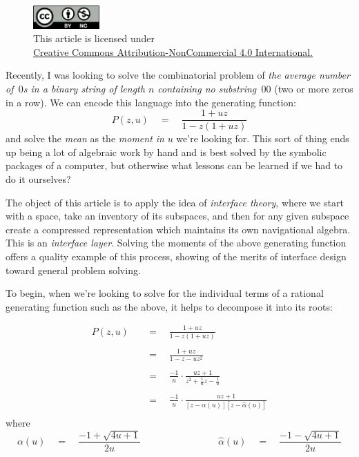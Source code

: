 \documentclass[twoside]{article}
\newcommand{\equals}{\ensuremath{\quad =\quad}}
\newcommand{\fourqquad}{\ensuremath{\qquad\qquad\qquad\qquad}}
\newcommand{\alphahat}{\ensuremath{\hat{\alpha}}}
\begin{document}
\begin{figure}[h]
\centering
\includegraphics[width=1in]{../../../cc-by-nc.png}\\[0.1in]
\tiny This article is licensed under \\
\href{http://creativecommons.org/licenses/by-nc/4.0/}
{Creative Commons Attribution-NonCommercial 4.0 International.}\\[0.3in]
\end{figure}

Recently, I was looking to solve the combinatorial problem of \emph{the average number of \,$ 0 $s in a binary string of length
$ n $ containing no substring \,$ 00 $} (two or more zeros in a row). We can encode this language into the generating function:
$$ P(z,u)\quad=\quad\frac{1+uz}{1-z(1+uz)} $$
and solve the \emph{mean} as the \emph{moment in} $ u $ we're looking for. This sort of thing ends up being a lot of algebraic
work by hand and is best solved by the symbolic packages of a computer, but otherwise what lessons can be learned if we had to
do it ourselves?

The object of this article is to apply the idea of \emph{interface theory}, where we start with a space, take an inventory
of its subspaces, and then for any given subspace create a compressed representation which maintains its own navigational algebra.
This is an \emph{interface layer}. Solving the moments of the above generating function offers a quality example of this process,
showing of the merits of interface design toward general problem solving.

To begin, when we're looking to solve for the individual terms of a rational generating function such as the above, it helps to decompose
it into its roots:

\begin{align*}
P(z,u)	& \equals \frac{1+uz}{1-z(1+uz)}						\\
											\\
	& \equals \frac{1+uz}{1-z-uz^2}							\\
											\\
	& \equals \frac{-1}{u} \cdot \frac{uz+1}{z^2+\frac{1}{u}z-\frac{1}{u}}		\\
											\\
	& \equals \frac{-1}{u} \cdot \frac{uz+1}{[z-\alpha(u)][z-\alphahat(u)]}		\\
\end{align*}
where
$$ \alpha(u) \equals \frac{-1+\sqrt{4u+1}}{2u} \fourqquad \alphahat(u) \equals \frac{-1-\sqrt{4u+1}}{2u} $$
\end{document}
